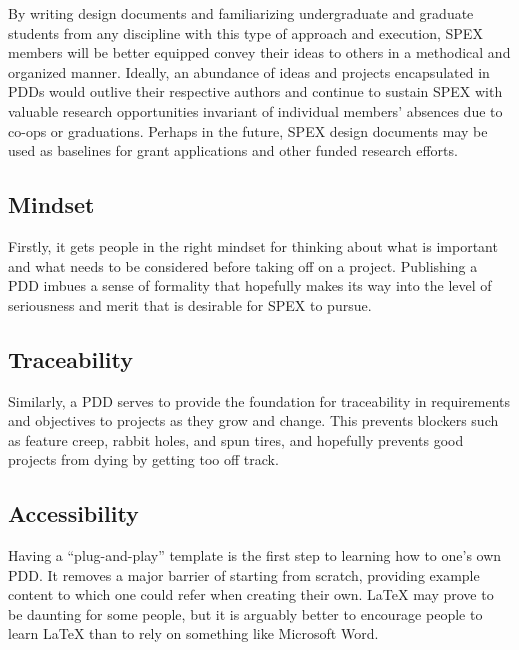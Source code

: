\documentclass[conference]{IEEEtran} %
\begin{document}
By writing design documents and familiarizing undergraduate and graduate students from any discipline with this type of approach and execution, SPEX members will be better equipped convey their ideas to others in a methodical and organized manner.
Ideally, an abundance of ideas and projects encapsulated in PDDs would outlive their respective authors and continue to sustain SPEX with valuable research opportunities invariant of individual members' absences due to co-ops or graduations.
Perhaps in the future, SPEX design documents may be used as baselines for grant applications and other funded research efforts.



\subsection{Mindset}
\label{subsec:mindset}
Firstly, it gets people in the right mindset for thinking about what is important and what needs to be considered before taking off on a project.
Publishing a PDD imbues a sense of formality that hopefully makes its way into the level of seriousness and merit that is desirable for SPEX to pursue.

\subsection{Traceability}
\label{subsec:traceability}
Similarly, a PDD serves to provide the foundation for traceability in requirements and objectives to projects as they grow and change.
This prevents blockers such as feature creep, rabbit holes, and spun tires, and hopefully prevents good projects from dying by getting too off track.

\subsection{Accessibility}
\label{subsec:plug-n-play}

Having a ``plug-and-play'' template is the first step to learning how to one's own PDD\@.
It removes a major barrier of starting from scratch, providing example content to which one could refer when creating their own.
\LaTeX{} may prove to be daunting for some people, but it is arguably better to encourage people to learn LaTeX than to rely on something like Microsoft Word.
\end{document}
